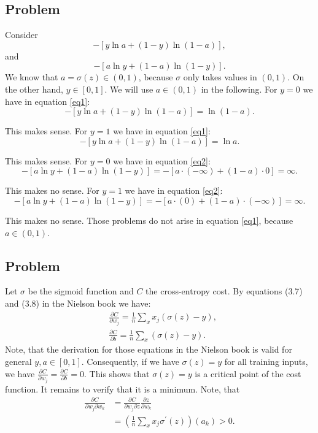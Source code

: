 \documentclass{article}
\begin{document}
\subsection{Problem}
Consider 
\begin{equation}
\label{eq1}
	-[y \ln a+(1-y) \ln (1-a)],
\end{equation}
and
\begin{equation}
\label{eq2}
	-[a \ln y+(1-a) \ln (1-y)].
\end{equation}
We know that $a=\sigma(z)\in (0,1)$, because $\sigma$ only takes values in $(0,1)$. On the other hand, $y\in [0,1]$. We will use $a\in (0,1)$ in the following.
For $y= 0$ we have in equation \eqref{eq1}:
\begin{equation*}
	-[y \ln a+(1-y) \ln (1-a)]=\ln (1-a).
\end{equation*}

This makes sense. For $y= 1$ we have in equation \eqref{eq1}:
\begin{equation*}
	-[y \ln a+(1-y) \ln (1-a)]=\ln a.
\end{equation*}

This makes sense. For $y= 0$ we have in equation \eqref{eq2}:
\begin{equation*}
	-[a \ln y+(1-a) \ln (1-y)]= -[a \cdot (-\infty) +(1-a) \cdot 0]=\infty.
\end{equation*}

This makes no sense. For $y= 1$ we have in equation \eqref{eq2}:
\begin{equation*}
	-[a \ln y+(1-a) \ln (1-y)]= -[a \cdot (0) +(1-a) \cdot (-\infty)]=\infty.
\end{equation*}

This makes no sense. Those problems do not arise in equation \eqref{eq1}, because $a\in (0,1)$.

\subsection{Problem}
Let $\sigma$ be the sigmoid function and $C$ the cross-entropy cost. By equations (3.7) and (3.8) in the Nielson book we have:
$$
\begin{aligned}
	&\frac{\partial C}{\partial w_j}=\frac{1}{n} \sum_x x_j(\sigma(z)-y),
	\\&\frac{\partial C}{\partial b}=\frac{1}{n} \sum_x(\sigma(z)-y).
\end{aligned}
$$
Note, that the derivation for those equations in the Nielson book is valid for general $y,a\in [0,1]$. Consequently, if we have $\sigma(z)=y$ for all training inputs, we have $\frac{\partial C}{\partial w_j}=\frac{\partial C}{\partial b}=0$. This shows that $\sigma(z)=y$ is a critical point of the cost function. It remains to verify that it is a minimum. Note, that
$$
\begin{aligned}
	\frac{\partial C}{\partial w_j\partial w_k}&=\frac{\partial C}{\partial w_j\partial z}\frac{\partial z}{\partial w_k}
	\\&=\left(\frac{1}{n} \sum_x x_j\sigma^{\prime}(z)\right)\left(a_k\right)>0.
\end{aligned}
$$
\end{document}
